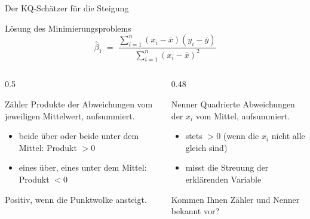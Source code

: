 \documentclass[aspectratio=169,11pt]{beamer}
\begin{document}
\begin{frame}{Der KQ-Schätzer für die Steigung}
  \begin{block}{Lösung des Minimierungsproblems}
    \[
      \hat{\beta}_1
      \;=\;
      \frac{\sum_{i=1}^{n} (x_i - \bar{x})(y_i - \bar{y})}
           {\sum_{i=1}^{n} (x_i - \bar{x})^{2}}
    \]
  \end{block}

  \begin{columns}[T]
    \begin{column}{0.5\textwidth}
      \begin{block}{Zähler}
        Produkte der Abweichungen vom jeweiligen Mittelwert, aufsummiert.
        \begin{itemize}
          \item beide über oder beide unter dem Mittel: Produkt $> 0$
          \item eines über, eines unter dem Mittel: Produkt $< 0$
        \end{itemize}
        Positiv, wenn die Punktwolke ansteigt.
      \end{block}
    \end{column}
    \begin{column}{0.48\textwidth}
      \begin{block}{Nenner}
        Quadrierte Abweichungen der $x_i$ vom Mittel, aufsummiert.
        \begin{itemize}
          \item stets $> 0$ (wenn die $x_i$ nicht alle gleich sind)
          \item misst die Streuung der erklärenden Variable
        \end{itemize}
      \end{block}
      \footnotesize Kommen Ihnen Zähler und Nenner bekannt vor?
    \end{column}
  \end{columns}
\end{frame}
\end{document}

